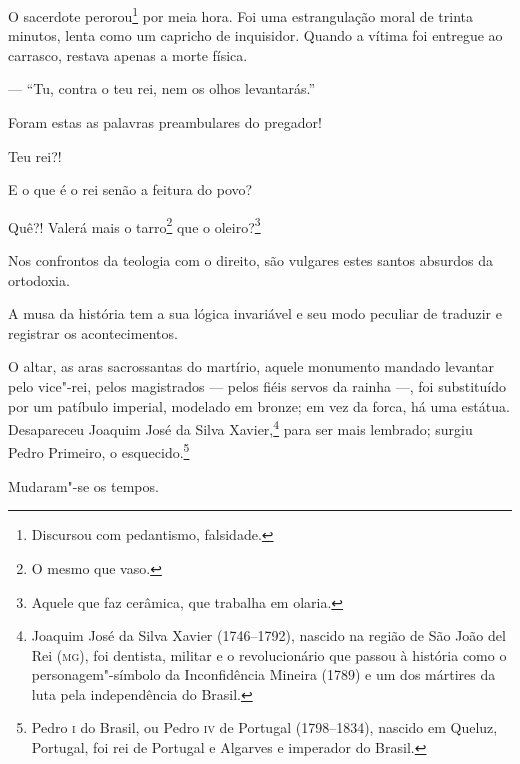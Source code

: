 O sacerdote perorou\footnote{Discursou com pedantismo, falsidade.} por
meia hora. Foi uma estrangulação moral de trinta minutos, lenta como um
capricho de inquisidor. Quando a vítima foi entregue ao carrasco,
restava apenas a morte física.

--- ``Tu, contra o teu rei, nem os olhos levantarás.''

Foram estas as palavras preambulares do pregador!

Teu rei?!

E o que é o rei senão a feitura do povo?

Quê?! Valerá mais o tarro\footnote{O mesmo que vaso.} que o
oleiro?\footnote{Aquele que faz cerâmica, que trabalha em olaria.}

Nos confrontos da teologia com o direito, são vulgares estes santos
absurdos da ortodoxia.


\noindent\dotfill{}


\noindent\dotfill{}

A musa da história tem a sua lógica invariável e seu modo peculiar de
traduzir e registrar os acontecimentos.

O altar, as aras sacrossantas do martírio, aquele monumento mandado
levantar pelo vice"-rei, pelos magistrados --- pelos fiéis servos da
rainha ---, foi substituído por um patíbulo imperial, modelado em
bronze; em vez da forca, há uma estátua. Desapareceu Joaquim José da
Silva Xavier,\footnote{Joaquim José da Silva Xavier (1746--1792),
  nascido na região de São João del Rei (\textsc{mg}), foi dentista, militar e o
  revolucionário que passou à história como o personagem"-símbolo da
  Inconfidência Mineira (1789) e um dos mártires da luta pela
  independência do Brasil.} para ser mais lembrado; surgiu Pedro
Primeiro, o esquecido.\footnote{Pedro \textsc{i} do Brasil, ou Pedro \textsc{iv} de
  Portugal (1798--1834), nascido em Queluz, Portugal, foi rei de Portugal
  e Algarves e imperador do Brasil.}

Mudaram"-se os tempos.\enlargethispage{\baselineskip}

